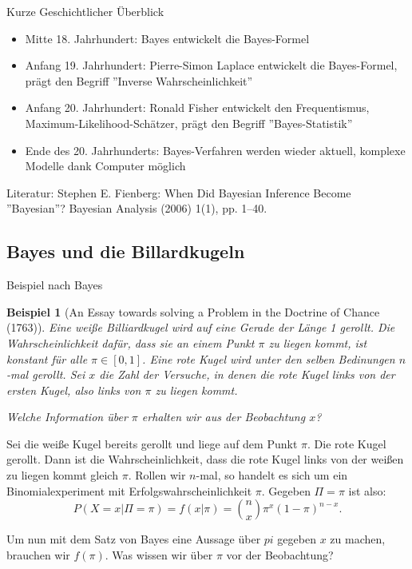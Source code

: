 \documentclass[german]{beamer}
\newtheorem{Bsp}{Beispiel}
\numberwithin{Bsp}{section}
\numberwithin{Def}{section}
\numberwithin{Stz}{section}
\begin{document}
\begin{frame}{Kurze Geschichtlicher Überblick}
\begin{itemize}
\item Mitte 18. Jahrhundert: Bayes entwickelt die Bayes-Formel
\item Anfang 19. Jahrhundert: Pierre-Simon Laplace entwickelt die Bayes-Formel, prägt den Begriff ''Inverse Wahrscheinlichkeit''
\item Anfang 20. Jahrhundert: Ronald Fisher entwickelt den Frequentismus, Maximum-Likelihood-Schätzer, prägt den Begriff ''Bayes-Statistik''
\item Ende des 20. Jahrhunderts: Bayes-Verfahren werden wieder aktuell, komplexe Modelle dank Computer möglich
\end{itemize}
\footnotesize Literatur:  Stephen E. Fienberg: When Did Bayesian Inference Become
''Bayesian''? Bayesian Analysis (2006) 1(1), pp. 1–40.
\end{frame}

\subsection{Bayes und die Billardkugeln}

\begin{frame}{Beispiel nach Bayes}
\begin{Bsp}[An Essay towards solving a Problem in the Doctrine of Chance (1763)]
\label{bsp:kugelnachbayes}
Eine weiße Billiardkugel wird auf eine Gerade der Länge 1 gerollt. Die Wahrscheinlichkeit dafür, dass sie an einem Punkt $\pi$ zu liegen kommt, ist konstant für alle $\pi \in [0,1]$. Eine rote Kugel wird unter den selben Bedinungen $n$-mal gerollt. Sei $x$ die Zahl der Versuche, in denen die rote Kugel links von der ersten Kugel, also links von $\pi$ zu liegen kommt.

Welche Information über $\pi$ erhalten wir aus der Beobachtung $x$?
\end{Bsp}

Sei die weiße Kugel bereits gerollt und liege auf dem Punkt $\pi$. Die rote Kugel gerollt. Dann ist die Wahrscheinlichkeit, dass die rote Kugel links von der weißen zu liegen kommt gleich $\pi$. Rollen wir $n$-mal, so handelt es sich um ein Binomialexperiment mit Erfolgswahrscheinlichkeit $\pi$. Gegeben $\Pi=\pi$ ist also:
\[
P(X=x|\Pi=\pi)=f(x|\pi)={{n}\choose{x}}\pi^x(1-\pi)^{n-x}.
\]

Um nun mit dem Satz von Bayes eine Aussage über $pi$ gegeben $x$ zu machen, brauchen wir $f(\pi)$. Was wissen wir  über $\pi$ vor der Beobachtung?
\end{frame}
\end{document}

